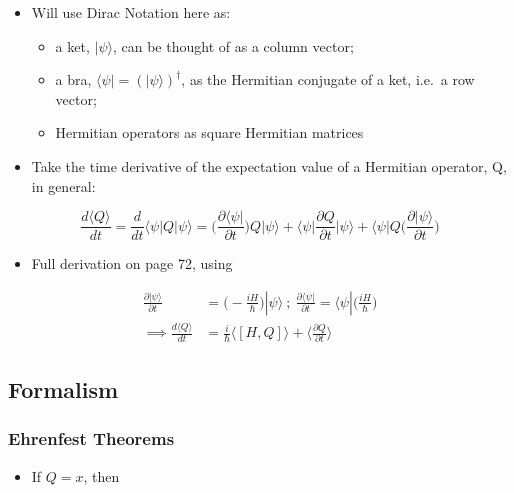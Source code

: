 \documentclass[a4paper,11pt,normalem]{article}
\begin{document}
\begin{itemize}
\item
  Will use Dirac Notation here as:
  \begin{itemize}
  \item
    a ket, \(|\psi\rangle\), can be thought of as a column vector;
  \item
    a bra, \(\langle \psi | = (|\psi\rangle)^\dagger\), as the Hermitian
    conjugate of a ket, i.e.~a row vector;
  \item
    Hermitian operators as square Hermitian matrices
  \end{itemize}
\item
  Take the time derivative of the expectation value of a Hermitian
  operator, Q, in general:
\end{itemize}

\[
    \frac{d\langle Q \rangle}{dt} = \frac{d}{dt}\langle\psi |Q|\psi\rangle = \bigg(\frac{\partial \langle\psi |}{\partial t}\bigg)Q|\psi\rangle + \langle\psi | \frac{\partial Q}{\partial t}|\psi\rangle + \langle\psi |Q \bigg(\frac{\partial |\psi\rangle}{\partial t}\bigg)
\]

\begin{itemize}
\item
  Full derivation on page 72, using
\end{itemize}

\[
    \begin{aligned}
    \frac{\partial |\psi\rangle}{\partial t} &= \bigg(-\frac{iH}{\hbar}\bigg)|\psi\rangle ~;~ \frac{\partial \langle \psi |}{\partial t} = \langle\psi |\bigg(\frac{iH}{\hbar}\bigg) \\
    \implies \frac{d\langle Q \rangle}{dt} &= \frac{i}{\hbar}\langle[H, Q]\rangle + \bigg\langle \frac{\partial Q}{\partial t}\bigg\rangle
    \end{aligned}
\]

\subsection{Formalism}\label{formalism}

\subsubsection{Ehrenfest Theorems}\label{ehrenfest-theorems}

\begin{itemize}
\item
  If \(Q = x\), then
\end{itemize}
\end{document}
